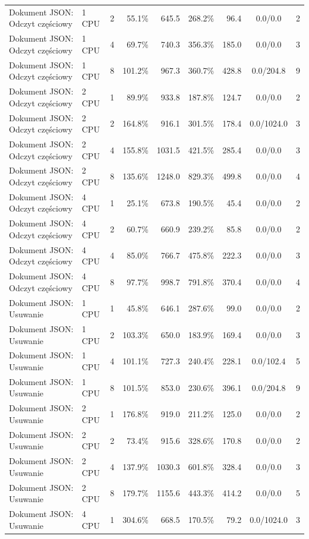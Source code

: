 \begin{table}[ht]
{\begin{tabular}{llcrrrrcc}
Dokument JSON: Odczyt częściowy & 1 CPU & 2 & 55.1\% & 645.5 & 268.2\% & 96.4 & 0.0/0.0 & 2 \\
Dokument JSON: Odczyt częściowy & 1 CPU & 4 & 69.7\% & 740.3 & 356.3\% & 185.0 & 0.0/0.0 & 3 \\
Dokument JSON: Odczyt częściowy & 1 CPU & 8 & 101.2\% & 967.3 & 360.7\% & 428.8 & 0.0/204.8 & 9 \\
Dokument JSON: Odczyt częściowy & 2 CPU & 1 & 89.9\% & 933.8 & 187.8\% & 124.7 & 0.0/0.0 & 2 \\
Dokument JSON: Odczyt częściowy & 2 CPU & 2 & 164.8\% & 916.1 & 301.5\% & 178.4 & 0.0/1024.0 & 3 \\
Dokument JSON: Odczyt częściowy & 2 CPU & 4 & 155.8\% & 1031.5 & 421.5\% & 285.4 & 0.0/0.0 & 3 \\
Dokument JSON: Odczyt częściowy & 2 CPU & 8 & 135.6\% & 1248.0 & 829.3\% & 499.8 & 0.0/0.0 & 4 \\
Dokument JSON: Odczyt częściowy & 4 CPU & 1 & 25.1\% & 673.8 & 190.5\% & 45.4 & 0.0/0.0 & 2 \\
Dokument JSON: Odczyt częściowy & 4 CPU & 2 & 60.7\% & 660.9 & 239.2\% & 85.8 & 0.0/0.0 & 2 \\
Dokument JSON: Odczyt częściowy & 4 CPU & 4 & 85.0\% & 766.7 & 475.8\% & 222.3 & 0.0/0.0 & 3 \\
Dokument JSON: Odczyt częściowy & 4 CPU & 8 & 97.7\% & 998.7 & 791.8\% & 370.4 & 0.0/0.0 & 4 \\
Dokument JSON: Usuwanie & 1 CPU & 1 & 45.8\% & 646.1 & 287.6\% & 99.0 & 0.0/0.0 & 2 \\
Dokument JSON: Usuwanie & 1 CPU & 2 & 103.3\% & 650.0 & 183.9\% & 169.4 & 0.0/0.0 & 3 \\
Dokument JSON: Usuwanie & 1 CPU & 4 & 101.1\% & 727.3 & 240.4\% & 228.1 & 0.0/102.4 & 5 \\
Dokument JSON: Usuwanie & 1 CPU & 8 & 101.5\% & 853.0 & 230.6\% & 396.1 & 0.0/204.8 & 9 \\
Dokument JSON: Usuwanie & 2 CPU & 1 & 176.8\% & 919.0 & 211.2\% & 125.0 & 0.0/0.0 & 2 \\
Dokument JSON: Usuwanie & 2 CPU & 2 & 73.4\% & 915.6 & 328.6\% & 170.8 & 0.0/0.0 & 2 \\
Dokument JSON: Usuwanie & 2 CPU & 4 & 137.9\% & 1030.3 & 601.8\% & 328.4 & 0.0/0.0 & 3 \\
Dokument JSON: Usuwanie & 2 CPU & 8 & 179.7\% & 1155.6 & 443.3\% & 414.2 & 0.0/0.0 & 5 \\
Dokument JSON: Usuwanie & 4 CPU & 1 & 304.6\% & 668.5 & 170.5\% & 79.2 & 0.0/1024.0 & 3 \\

\end{tabular}}
\end{table}
